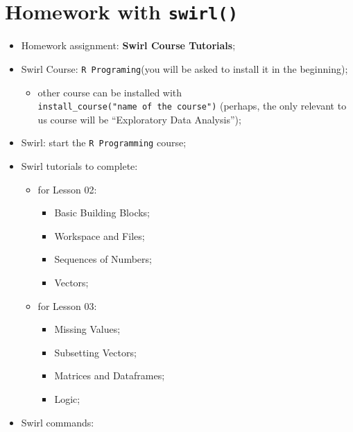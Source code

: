 \documentclass[
]{book}
\providecommand{\tightlist}{%
  \setlength{\itemsep}{0pt}\setlength{\parskip}{0pt}}
\begin{document}
\hypertarget{homework-with-swirl}{%
\section{\texorpdfstring{Homework with \texttt{swirl()}}{Homework with swirl()}}\label{homework-with-swirl}}

\begin{itemize}
\tightlist
\item
  Homework assignment: \textbf{Swirl Course Tutorials};
\item
  Swirl Course: \texttt{R\ Programing}(you will be asked to install it in the beginning);

  \begin{itemize}
  \tightlist
  \item
    other course can be installed with \texttt{install\_course("name\ of\ the\ course")} (perhaps, the only relevant to us course will be ``Exploratory Data Analysis'');
  \end{itemize}
\item
  Swirl: start the \texttt{R\ Programming} course;
\item
  Swirl tutorials to complete:

  \begin{itemize}
  \tightlist
  \item
    for Lesson 02:

    \begin{itemize}
    \tightlist
    \item
      Basic Building Blocks;
    \item
      Workspace and Files;
    \item
      Sequences of Numbers;
    \item
      Vectors;
    \end{itemize}
  \item
    for Lesson 03:

    \begin{itemize}
    \tightlist
    \item
      Missing Values;
    \item
      Subsetting Vectors;
    \item
      Matrices and Dataframes;
    \item
      Logic;
    \end{itemize}
  \end{itemize}
\item
  Swirl commands:


\end{itemize}
\end{document}
